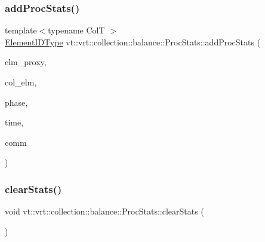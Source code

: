 \subsubsection{\texorpdfstring{add\+Proc\+Stats()}{addProcStats()}}
{\footnotesize\ttfamily template$<$typename ColT $>$ \\
\hyperlink{namespacevt_1_1vrt_1_1collection_1_1balance_a14c8d2c972f2913aa3f1636e5be0a120}{Element\+I\+D\+Type} vt\+::vrt\+::collection\+::balance\+::\+Proc\+Stats\+::add\+Proc\+Stats (\begin{DoxyParamCaption}\item[{\hyperlink{namespacevt_1_1vrt_a620a5c8c59d13e513f690c74b4af516f}{Virtual\+Elm\+Proxy\+Type}$<$ ColT $>$ const \&}]{elm\+\_\+proxy,  }\item[{ColT $\ast$}]{col\+\_\+elm,  }\item[{\hyperlink{namespacevt_a46ce6733d5cdbd735d561b7b4029f6d7}{Phase\+Type} const \&}]{phase,  }\item[{\hyperlink{namespacevt_a876a9d0cd5a952859c72de8a46881442}{Time\+Type} const \&}]{time,  }\item[{\hyperlink{namespacevt_1_1vrt_1_1collection_1_1balance_aa50d4cbbfa3c643e7303fc6e08f411fb}{Comm\+Map\+Type} const \&}]{comm }\end{DoxyParamCaption})\hspace{0.3cm}{\ttfamily [static]}}

\mbox{\label{structvt_1_1vrt_1_1collection_1_1balance_1_1_proc_stats_a9a47e5d00d2645f76f2a21e75996fe8b}} 
\subsubsection{\texorpdfstring{clear\+Stats()}{clearStats()}}
{\footnotesize\ttfamily void vt\+::vrt\+::collection\+::balance\+::\+Proc\+Stats\+::clear\+Stats (\begin{DoxyParamCaption}{ }\end{DoxyParamCaption})\hspace{0.3cm}{\ttfamily [static]}}

\mbox{\label{structvt_1_1vrt_1_1collection_1_1balance_1_1_proc_stats_aa04cc1fc5b6a17b7d4613f77258542c8}} 
